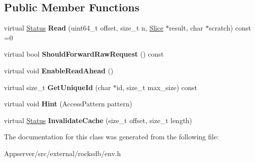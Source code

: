 \subsection*{Public Member Functions}
\begin{DoxyCompactItemize}
\item 
virtual \hyperlink{classrocksdb_1_1Status}{Status} {\bfseries Read} (uint64\+\_\+t offset, size\+\_\+t n, \hyperlink{classrocksdb_1_1Slice}{Slice} $\ast$result, char $\ast$scratch) const =0\hypertarget{classrocksdb_1_1RandomAccessFile_a3dc8a3221deea7b19942817f28b67901}{}\label{classrocksdb_1_1RandomAccessFile_a3dc8a3221deea7b19942817f28b67901}

\item 
virtual bool {\bfseries Should\+Forward\+Raw\+Request} () const\hypertarget{classrocksdb_1_1RandomAccessFile_a84074bac1f8e4fe53398d5df523935f5}{}\label{classrocksdb_1_1RandomAccessFile_a84074bac1f8e4fe53398d5df523935f5}

\item 
virtual void {\bfseries Enable\+Read\+Ahead} ()\hypertarget{classrocksdb_1_1RandomAccessFile_a2e137637b698a77bf80015ca47a40d8c}{}\label{classrocksdb_1_1RandomAccessFile_a2e137637b698a77bf80015ca47a40d8c}

\item 
virtual size\+\_\+t {\bfseries Get\+Unique\+Id} (char $\ast$id, size\+\_\+t max\+\_\+size) const\hypertarget{classrocksdb_1_1RandomAccessFile_a26830ba238bc7a568c99844e44483784}{}\label{classrocksdb_1_1RandomAccessFile_a26830ba238bc7a568c99844e44483784}

\item 
virtual void {\bfseries Hint} (Access\+Pattern pattern)\hypertarget{classrocksdb_1_1RandomAccessFile_a9081eb53804e3a1ca8d9c3ad38f31395}{}\label{classrocksdb_1_1RandomAccessFile_a9081eb53804e3a1ca8d9c3ad38f31395}

\item 
virtual \hyperlink{classrocksdb_1_1Status}{Status} {\bfseries Invalidate\+Cache} (size\+\_\+t offset, size\+\_\+t length)\hypertarget{classrocksdb_1_1RandomAccessFile_acbd49dea162d3457dc4b6c121479a582}{}\label{classrocksdb_1_1RandomAccessFile_acbd49dea162d3457dc4b6c121479a582}

\end{DoxyCompactItemize}


The documentation for this class was generated from the following file\+:\begin{DoxyCompactItemize}
\item 
Appserver/src/external/rocksdb/env.\+h\end{DoxyCompactItemize}
